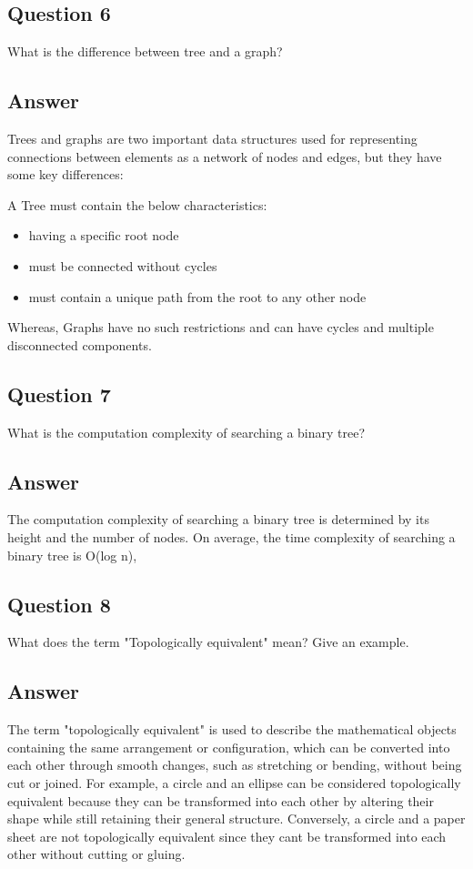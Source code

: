\documentclass[12]{article}
\begin{document}
\subsection*{Question 6}
What is the difference between tree and a graph?
\subsection*{Answer}

Trees and graphs are two important data structures used for representing connections between elements as a network of nodes and edges, but they have some key differences:

A Tree must contain the below characteristics:

\begin{itemize}
    \item having a specific root node
    \item must be connected without cycles
    \item must contain a unique path from the root to any other node
\end{itemize}
 
Whereas, Graphs have no such restrictions and can have cycles and multiple disconnected components. 

\subsection*{Question 7}
What is the computation complexity of searching a binary tree?
\subsection*{Answer}
The computation complexity of searching a binary tree is determined by its height and the number of nodes. On average, the time complexity of searching a binary tree is O(log n), 

\subsection*{Question 8}
What does the term "Topologically equivalent" mean? Give an example.

\subsection*{Answer}
The term "topologically equivalent" is used to describe the mathematical objects containing the same arrangement or configuration, which can be converted into each other through smooth changes, such as stretching or bending, without being cut or joined. 
For example, a circle and an ellipse can be considered topologically equivalent because they can be transformed into each other by altering their shape while still retaining their general structure. Conversely, a circle and a paper sheet are not topologically equivalent since they cant be transformed into each other without cutting or gluing. 
\end{document}
